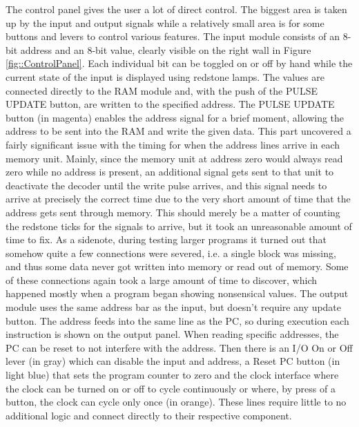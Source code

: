 The control panel gives the user a lot of direct control. The biggest area is taken up by the input and output signals while a relatively small area is for some buttons and levers to control various features. The input module consists of an 8-bit address and an 8-bit value, clearly visible on the right wall in Figure \ref{fig::ControlPanel}. Each individual bit can be toggled on or off by hand while the current state of the input is displayed using redstone lamps. The values are connected directly to the RAM module and, with the push of the PULSE UPDATE button, are written to the specified address. The PULSE UPDATE button (in magenta) enables the address signal for a brief moment, allowing the address to be sent into the RAM and write the given data. This part uncovered a fairly significant issue with the timing for when the address lines arrive in each memory unit. Mainly, since the memory unit at address zero would always read zero while no address is present, an additional signal gets sent to that unit to deactivate the decoder until the write pulse arrives, and this signal needs to arrive at precisely the correct time due to the very short amount of time that the address gets sent through memory. This should merely be a matter of counting the redstone ticks for the signals to arrive, but it took an unreasonable amount of time to fix. As a sidenote, during testing larger programs it turned out that somehow quite a few connections were severed, i.e. a single block was missing, and thus some data never got written into memory or read out of memory. Some of these connections again took a large amount of time to discover, which happened mostly when a program began showing nonsensical values. The output module uses the same address bar as the input, but doesn't require any update button. The address feeds into the same line as the PC, so during execution each instruction is shown on the output panel. When reading specific addresses, the PC can be reset to not interfere with the address. Then there is an I/O On or Off lever (in gray) which can disable the input and address, a Reset PC button (in light blue) that sets the program counter to zero and the clock interface where the clock can be turned on or off to cycle continuously or where, by press of a button, the clock can cycle only once (in orange). These lines require little to no additional logic and connect directly to their respective component.

